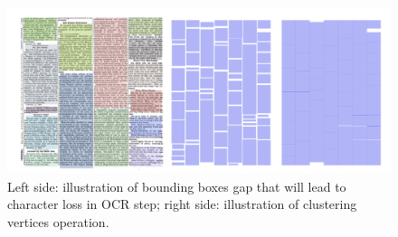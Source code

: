 \documentclass[letterpaper]{article} %
\begin{document}
 \begin{figure}[h]
   \centering
   \includegraphics[width=\linewidth]{LaTeX/Figures/clustering_v.png}
   \caption{Left side: illustration of bounding boxes gap that will lead to character loss in OCR step; right side: illustration of clustering vertices operation.}
   \label{fig:character_loss}
 \end{figure}
 




\end{document}
